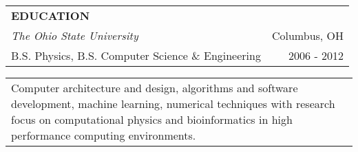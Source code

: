 \begin{tabularx}{\textwidth}{ L R }
  \textbf{EDUCATION} & \\
  \textit{The Ohio State University} & Columbus, OH \\
  B.S. Physics, B.S. Computer Science \& Engineering & 2006 - 2012 \\
\end{tabularx}
\begin{small}
  \begin{tabularx}{\textwidth}{ X }
    Computer architecture and design, algorithms and software development, machine learning, numerical techniques with research focus on computational physics and bioinformatics in high performance computing environments. \\
  \end{tabularx}
\end{small}
